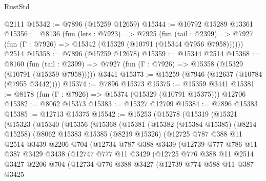 \begin{lexlean}{RustStd}
\begin{coremodule}
{\begin{coremodule}
{{{{{{{{{{{{{{{{{{{{{{{{{{{{{{{{{{{{{{{{{{{{{{{{{{    @2111
@15342 := @7896 (@15259 @12659)
@15344 := @10792 @15289 @13361
@15356 := @8136
    (fun (lets : @7923) =>
    @7925
      (fun (tail : @2399) =>
      @7927 (fun (Γ : @7926) => @15342 (@15329 (@10791 (@15344 @7956 @7958))))))
    @2514
@15358 := @7896 (@15259 @12678)
@15359 := @15344 @2514
@15368 := @8160
    (fun (tail : @2399) => @7927 (fun (Γ : @7926) => @15358 (@15329 (@10791 (@15359 @7958)))))
    @3441
@15373 := @15259 (@7946 (@12637 (@10784 (@7955 @3442))))
@15374 := @7896 @15373
@15375 := @15359 @3441
@15381 := @8178 (fun (Γ : @7926) => @15374 (@15329 (@10791 @15375))) @12706
@15382 := @8062 @15373
@15383 := @15327 @12709
@15384 := @7896 @15383
@15385 := @12713 @15375
@15542 := @15253
    (@15278
      (@15319
        (@15321
          (@15323
            (@15340
              (@15356
                (@15368
                  (@15381
                    (@15382
                      (@15384 @15385)
                      (@8214 @15258)
                      (@8062
                        @15383
                        @15385
                        (@8219 @15326)
                        (@12725
                          @787
                          @388
                          @11
                          @2514
                          @3439
                          @2206
                          @704
                          (@12734
                            @787
                            @388
                            @3439
                            (@12739
                              @777
                              @786
                              @11
                              @387
                              @3429
                              @3438
                              (@12747
                                @777
                                @11
                                @3429
                                (@12725
                                  @776
                                  @388
                                  @11
                                  @2514
                                  @3427
                                  @2206
                                  @704
                                  (@12734
                                    @776
                                    @388
                                    @3427
                                    (@12739
                                      @774
                                      @588
                                      @11
                                      @387
                                      @3425
}}}}}}}}}}}}}}}}}}}}}}}}}}}}}}}}}}}}}}}}}}}}}}}}}}
\end{coremodule}}
\end{coremodule}
\end{lexlean}
